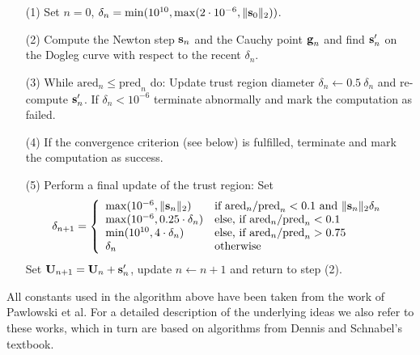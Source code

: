 \begin{itemize}
	\item[(1)]
	Set $n=0$, $\delta_n = \min(10^{10}, \max(2 \cdot 10^{-6}, \| \textbf{s}_0 \|_2 ))$.
	
	\item[(2)]
	Compute the Newton step $\textbf{s}_n$ and the Cauchy point  $\textbf{g}_n$ and
	find $\textbf{s}'_n$ on the Dogleg curve with respect to the recent $\delta_n$.
	
	\item[(3)]
	While $\textrm{ared}_n \leq \textrm{pred}_n$ do:
	Update trust region diameter $\delta_n \leftarrow 0.5 \ \delta_n$
	and re-compute $\textbf{s}'_n$.
	If $\delta_n < 10^{-6}$ terminate abnormally and mark the computation as failed.
	
	\item[(4)]
	If the convergence criterion (see below) is fulfilled, terminate and mark the computation as success.
	
	\item[(5)]
	Perform a final update of the trust region: Set
	\[
	\delta_{n+1} = \left\{ \begin{array}{ll}
		\max( 10^{-6}, \| \textbf{s}_n \|_2 ) & \text{if } \textrm{ared}_n / \textrm{pred}_n < 0.1 \text{ and } \| \textbf{s}_n \|_2 \delta_n \\
		\max( 10^{-6}, 0.25 \cdot \delta_n )    & \text{else, if } \textrm{ared}_n / \textrm{pred}_n < 0.1                                        \\
		\min( 10^{10}, 4 \cdot \delta_n )       & \text{else, if } \textrm{ared}_n / \textrm{pred}_n > 0.75                                       \\
		\delta_{n}                              & \text{otherwise}                                                                                \\
	\end{array} \right.
	\]
	Set $\textbf{U}_{n+1} = \textbf{U}_{n} + \textbf{s}'_{n} $, update $n \leftarrow n + 1$ and return to step (2).
	
\end{itemize}
All constants used in the algorithm above have been taken from the work of Pawlowski et al. \textcite{pawlowskiGlobalizationTechniquesNewton2006}
For a detailed description of the underlying ideas we also refer to these works,
which in turn are based on algorithms from Dennis and Schnabel's textbook. \textcite{dennisNumericalMethodsUnconstrained1996}


